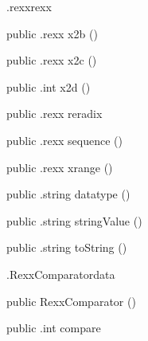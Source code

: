 \begin{CrexxClass}{.rexx}{rexx}
\begin{Members}
    \Method
      {public}
      {.rexx}
      {x2b}
      {()}

    \Method
      {public}
      {.rexx}
      {x2c}
      {()}

    \Method
      {public}
      {.int}
      {x2d}
      {()}

    \Method
      {public}
      {.rexx}
      {reradix}
      {}

    \Method
      {public}
      {.rexx}
      {sequence}
      {()}

    \Method
      {public}
      {.rexx}
      {xrange}
      {()}

    \Method
      {public}
      {.string}
      {datatype}
      {()}

    \Method
      {public}
      {.string}
      {stringValue}
      {()}

    \Method
      {public}
      {.string}
      {toString}
      {()}

  \end{Members}
\end{CrexxClass}

\begin{CrexxClass}{.RexxComparator}{data}

  \begin{Hierarchy}
  \end{Hierarchy}

  \begin{Members}

    \Factory
      {public}
      {RexxComparator}
      {()}

    \Method
      {public}
      {.int}
      {compare}
      {}

  \end{Members}
\end{CrexxClass}

